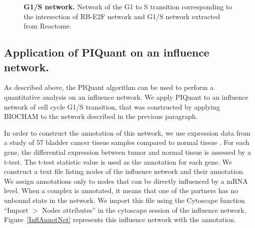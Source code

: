 \documentclass[10pt]{bmc_article}
\newenvironment{bmcformat}{\baselineskip20pt\sloppy\setboolean{publ}{false}}{\baselineskip20pt\sloppy}
\begin{document}
\begin{bmcformat}
\begin{figure}[h]
 \caption{\label{g1s}  \textbf{G1/S network.}
	Network of the G1 to S transition corresponding to the intersection of
RB-E2F network and G1/S network extracted from Reactome.}
\end{figure}


\subsection*{Application of PIQuant on an influence network.}
As described above, the PIQuant algorithm can be used to perform a quantitative
analysis on an influence network. We apply PIQuant to an influence network of
cell cycle G1/S transition, that was constructed by applying BIOCHAM
\cite{calzone2006biocham} to the network described in the
previous paragraph. 

In order to construct the annotation of this network, we use expression 
data from a study of 57 bladder cancer
tissue samples compared to normal tissue \cite{stransky2006regional}. For each 
gene, the differential expression between tumor and normal tissue
is assessed by a t-test. The t-test statistic value is used as the annotation for each gene. We construct a text file listing nodes of the influence network 
and their annotation. We assign annotations only to nodes that can be directly influenced by a 
mRNA level. When a complex is annotated, it means that one of the partners has no unbound state in the network. 
We import this file using the Cytoscape function 
``Import $>$ Nodes attributes'' 
in the cytoscape session of the influence network.
Figure~\ref{InflAnnotNet} represents this influence network with the annotation.
 


\end{bmcformat}
\end{document}
